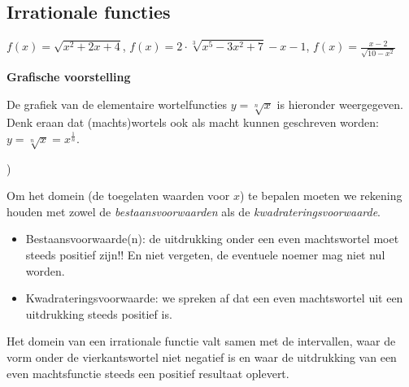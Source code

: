 
\subsection{Irrationale functies}

\begin{voorbeeld}
	$f(x)=\sqrt{x^{2}+2x+4}$, $f(x)=2\cdot \sqrt[3]{x^{5}-3x^{2}+7}-x-1$,
$f(x)=\frac{x-2}{\sqrt{10-x^{2}}}$
\end{voorbeeld}

\textbf{Grafische voorstelling}

De grafiek van de elementaire wortelfuncties $y=\sqrt[n]{x}$
is hieronder weergegeven. Denk eraan dat (machts)wortels ook als macht
kunnen geschreven worden: $y=\sqrt[n]{x}=x^{\frac{1}{n}}$.


\begin{figure}[H]
		
\end{figure})

Om het domein (de toegelaten waarden voor $x$) te bepalen moeten
we rekening houden met zowel de \emph{bestaansvoorwaarden} als de
\emph{kwadrateringsvoorwaarde}.

\begin{itemize}
	\item Bestaansvoorwaarde(n): de uitdrukking onder een even machtswortel
moet steeds positief zijn!! En niet vergeten, de eventuele noemer
mag niet nul worden.
\item Kwadrateringsvoorwaarde: we spreken af dat een even machtswortel uit
een uitdrukking steeds positief is.
\end{itemize}

Het domein van een irrationale functie valt samen met de intervallen,
waar de vorm onder de vierkantswortel niet negatief is en waar de
uitdrukking van een even machtsfunctie steeds een positief resultaat
oplevert.

